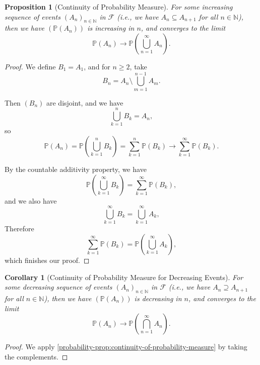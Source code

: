 \documentclass[11pt]{article}
\numberwithin{equation}{section}
\newtheorem{proposition}[theorem]{Proposition}
\newtheorem{corollary}[theorem]{Corollary}
\theoremstyle{definition}
\theoremstyle{remark}
\newcommand{\pqty}[1]{\left(#1\right)}
\newcommand{\NN}{\mathbb N}
\newcommand{\eventSpace}{\mathcal F}
\newcommand{\Prob}{\mathbb P}
\begin{document}
\begin{proposition}[Continuity of Probability Measure]\label{probability-proposition-003}
    \label{probability-prop:continuity-of-probability-measure}%
    For some \emph{increasing} sequence of events \(\pqty{A_n}_{n \in \NN}\) in \(\eventSpace\) (i.e., we have \(A_n \subseteq A_{n + 1}\) for all \(n \in \NN\)), then we have \(\pqty{\Prob\pqty{A_n}}\) is increasing in \(n\), and converges to the limit
    \[
        \Prob\pqty{A_n} \to \Prob\pqty{\bigcup_{n = 1}^{\infty} A_n}.
    \]
\end{proposition}

\begin{proof}\label{probability-proof-009}
    We define \(B_1 = A_1\), and for \(n \geq 2\), take
    \[
        B_n = A_n \setminus \bigcup_{m = 1}^{n - 1} A_m.
    \]

    Then \(\pqty{B_n}\) are disjoint, and we have
    \[
        \bigcup_{k = 1}^{n} B_k = A_n,
    \]
    so
    \[
        \Prob\pqty{A_n} = \Prob\pqty{\bigcup_{k = 1}^{n} B_k} = \sum_{k = 1}^{n} \Prob\pqty{B_k} \to \sum_{k = 1}^{\infty} \Prob\pqty{B_k}.
    \]

    By the countable additivity property, we have
    \[
        \Prob\pqty{\bigcup_{k = 1}^{\infty} B_k} = \sum_{k = 1}^{\infty} \Prob\pqty{B_k},
    \]
    and we also have
    \[
        \bigcup_{k = 1}^{\infty} B_k = \bigcup_{k = 1}^{\infty} A_k,
    \]
    Therefore
    \[
        \sum_{k = 1}^{\infty} \Prob\pqty{B_k} = \Prob\pqty{\bigcup_{k = 1}^{\infty} A_k},
    \]
    which finishes our proof.
\end{proof}

\begin{corollary}[Continuity of Probability Measure for Decreasing Events]\label{probability-corollary-003}
    \label{probability-cor:continuity-probability-measure-decreasing-sequence}%
     For some \emph{decreasing} sequence of events \(\pqty{A_n}_{n \in \NN}\) in \(\eventSpace\) (i.e., we have \(A_n \supseteq A_{n + 1}\) for all \(n \in \NN\)), then we have \(\pqty{\Prob\pqty{A_n}}\) is decreasing in \(n\), and converges to the limit
    \[
        \Prob\pqty{A_n} \to \Prob\pqty{\bigcap_{n = 1}^{\infty} A_n}.
    \]
\end{corollary}

\begin{proof}\label{probability-proof-010}
    We apply \autoref{probability-prop:continuity-of-probability-measure} by taking the complements.
\end{proof}
\end{document}
